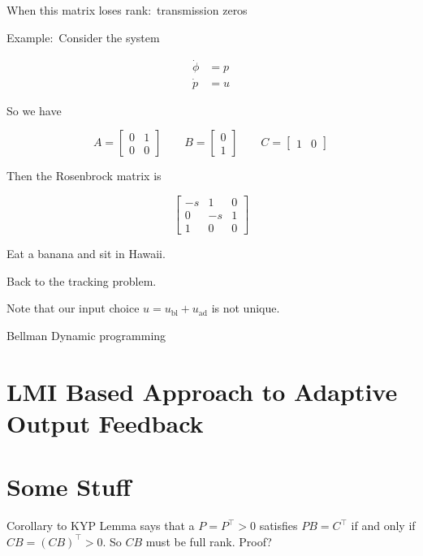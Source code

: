 When this matrix loses rank:\ transmission zeros

Example:\ Consider the system

\begin{equation*}
  \begin{split}
    \dot{\phi}&=p \\
    \dot{p}&=u
  \end{split}
\end{equation*}

So we have

\begin{equation*}
  A=
  \begin{bmatrix}
    0 & 1 \\
    0 & 0
  \end{bmatrix}
  \qquad
  B=
  \begin{bmatrix}
    0 \\
    1
  \end{bmatrix}
  \qquad
  C=
  \begin{bmatrix}
    1 & 0
  \end{bmatrix}
\end{equation*}

Then the Rosenbrock matrix is

\begin{equation*}
  \begin{bmatrix}
    -s & 1 & 0 \\
    0 & -s & 1 \\
    1 & 0 & 0
  \end{bmatrix}
\end{equation*}

Eat a banana and sit in Hawaii.

Back to the tracking problem.

Note that our input choice $u=u_{\text{bl}}+u_{\text{ad}}$ is not unique.

Bellman \textemdash{} Dynamic programming

\section{LMI Based Approach to Adaptive Output Feedback}

\section{Some Stuff}

Corollary to KYP Lemma says that a $P=P^{\top}>0$ satisfies $PB=C^{\top}$ if and only if $CB=(CB)^{\top}>0$.
So $CB$ must be full rank.
Proof?

